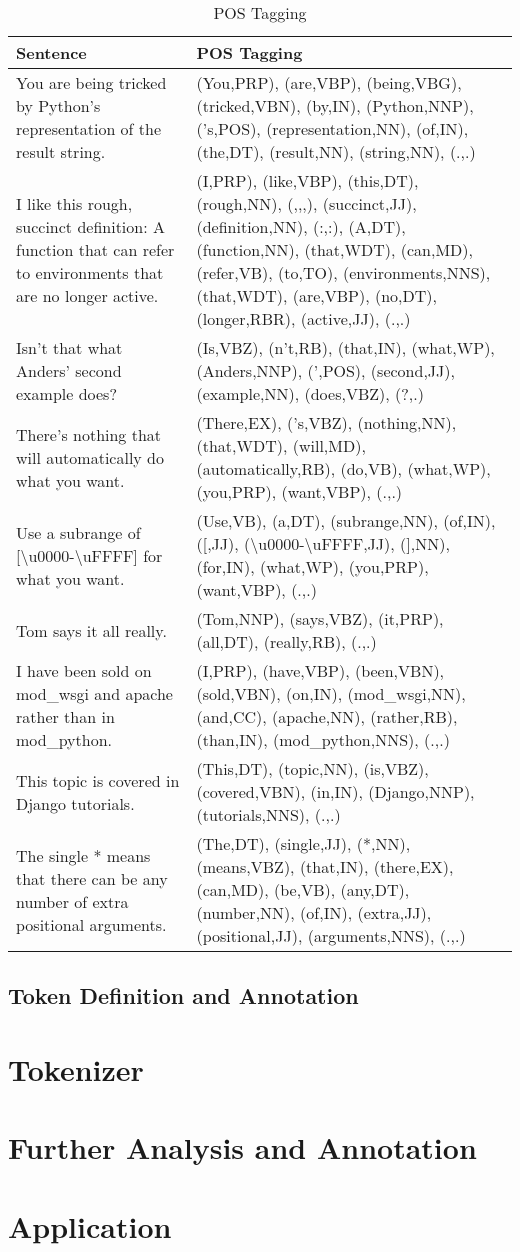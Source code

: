 \begin{table}
\caption{POS Tagging}\label{pos}
\begin{tabu}{X[1.15,l]X[2,l]}
    \textbf{Sentence} & \textbf{POS Tagging} \\
    \midrule
    You are being tricked by Python's representation of the result string.&
    (You,PRP), (are,VBP), (being,VBG), (tricked,VBN), (by,IN), (Python,NNP),
    ('s,POS), (representation,NN), (of,IN), (the,DT), (result,NN), 
    (string,NN), (.,.) \\
    I like this rough, succinct definition: A function that can refer to 
    environments that are no longer active.&
    (I,PRP), (like,VBP), (this,DT), (rough,NN), (,,,), (succinct,JJ),
    (definition,NN), (:,:), (A,DT), (function,NN), (that,WDT), (can,MD),
    (refer,VB), (to,TO), (environments,NNS), (that,WDT), (are,VBP), (no,DT),
    (longer,RBR), (active,JJ), (.,.) \\
    Isn't that what Anders' second example does? &
    (Is,VBZ), (n't,RB), (that,IN), (what,WP), (Anders,NNP), (',POS),
    (second,JJ), (example,NN), (does,VBZ), (?,.) \\
    There's nothing that will automatically do what you want. & 
    (There,EX), ('s,VBZ), (nothing,NN), (that,WDT), (will,MD),
    (automatically,RB), (do,VB), (what,WP), (you,PRP), (want,VBP), (.,.) \\
    Use a subrange of [\textbackslash{}u0000-\textbackslash{}uFFFF] for what
    you want. &
    (Use,VB), (a,DT), (subrange,NN), (of,IN), ([,JJ),
    (\textbackslash{}u0000-\textbackslash{}uFFFF,JJ), (],NN),
    (for,IN), (what,WP), (you,PRP), (want,VBP), (.,.) \\
    Tom says it all really. &
    (Tom,NNP), (says,VBZ), (it,PRP), (all,DT), (really,RB), (.,.) \\
    I have been sold on mod\_wsgi and apache rather than in mod\_python. &
    (I,PRP), (have,VBP), (been,VBN), (sold,VBN), (on,IN), (mod\_wsgi,NN),
    (and,CC), (apache,NN), (rather,RB), (than,IN), (mod\_python,NNS), (.,.) \\
    This topic is covered in Django tutorials. &
    (This,DT), (topic,NN), (is,VBZ), (covered,VBN), (in,IN), (Django,NNP),
    (tutorials,NNS), (.,.) \\
    The single * means that there can be any number of extra positional
    arguments. &
    (The,DT), (single,JJ), (*,NN), (means,VBZ), (that,IN), (there,EX), (can,MD),
    (be,VB), (any,DT), (number,NN), (of,IN), (extra,JJ), (positional,JJ),
    (arguments,NNS), (.,.) \\
\end{tabu} 
\end{table}

\subsection{Token Definition and Annotation}

\section{Tokenizer}

\section{Further Analysis and Annotation}

\section{Application}